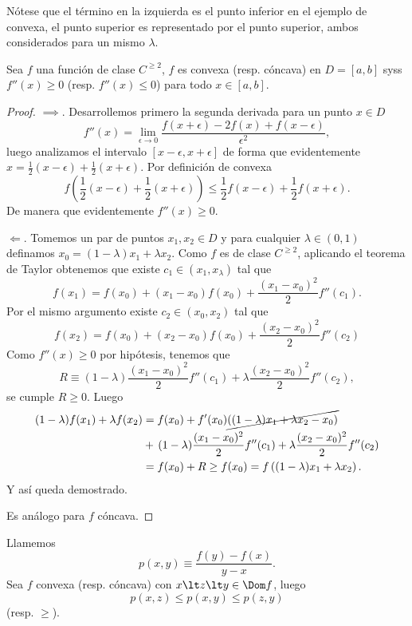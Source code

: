 \documentclass[11pt,oneside,a4paper]{book}
\begin{document}
Nótese que el término en la izquierda es el punto inferior en el ejemplo de convexa, el punto superior es representado por el punto superior, ambos considerados para un mismo $\lambda$.
\begin{thm}
Sea $f$ una función de clase $C^{\geq 2}$, $f$ es convexa (resp. cóncava) en $D=[a,b]$ syss $f''(x)\geq 0$ (resp. $f''(x)\leq 0$) para todo $x\in[a,b]$.
\end{thm}
\begin{proof}
$\implies$. Desarrollemos primero la segunda derivada para un punto $x\in D$
$$f''(x)=\lim_{\epsilon\to 0}\frac{f(x+\epsilon)-2f(x)+f(x-\epsilon)}{\epsilon^2},$$
luego analizamos el intervalo $[x-\epsilon,x+\epsilon]$ de forma que evidentemente $x=\frac 12(x-\epsilon)+\frac 12(x+\epsilon)$. Por definición de convexa
$$f\left(\frac 12(x-\epsilon)+\frac 12(x+\epsilon)\right)\leq\frac 12f(x-\epsilon)+\frac 12f(x+\epsilon).$$
De manera que evidentemente $f''(x)\geq 0$.

$\Longleftarrow$. Tomemos un par de puntos $x_1,x_2\in D$ y para cualquier $\lambda\in(0,1)$ definamos $x_0=(1-\lambda)x_1+\lambda x_2$. Como $f$ es de clase $C^{\geq 2}$, aplicando el teorema de Taylor obtenemos que existe $c_1\in(x_1,x_\lambda)$ tal que
$$f(x_1)=f(x_0)+(x_1-x_0)f(x_0)+\frac{(x_1-x_0)^2}{2}f''(c_1).$$
Por el mismo argumento existe $c_2\in(x_0,x_2)$ tal que
$$f(x_2)=f(x_0)+(x_2-x_0)f(x_0)+\frac{(x_2-x_0)^2}{2}f''(c_2)$$
Como $f''(x)\geq 0$ por hipótesis, tenemos que
$$R\equiv(1-\lambda)\frac{(x_1-x_0)^2}{2}f''(c_1)+\lambda\frac{(x_2-x_0)^2}{2}f''(c_2),$$
se cumple $R\geq 0$. Luego
\begin{align*}
(1-\lambda)f(x_1)+\lambda f(x_2)&=f(x_0)+f'(x_0)\cancel{(\left(1-\lambda)x_1+\lambda x_2-x_0\right)}\\
&+\,(1-\lambda)\frac{(x_1-x_0)^2}{2}f''(c_1)+\lambda\frac{(x_2-x_0)^2}{2}f''(c_2)\\
&=f(x_0)+R\geq f(x_0)=f\left((1-\lambda)x_1+\lambda x_2\right).
\end{align*}
Y así queda demostrado.

Es análogo para $f$ cóncava.
\end{proof}
\begin{thm}\label{thm:convex-inequality}
Llamemos
$$p(x,y)\equiv\frac{f(y)-f(x)}{y-x}.$$
Sea $f$ convexa (resp. cóncava) con $x\lt z\lt y\in\Dom f$, luego
$$p(x,z)\leq p(x,y)\leq p(z,y)$$
(resp. $\geq$).
\end{thm}
\end{document}
